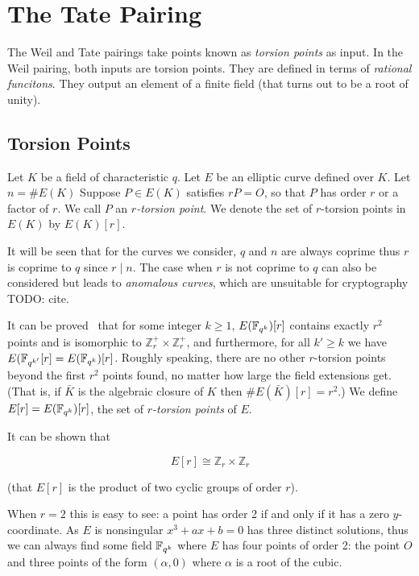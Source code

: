 \chapter {The Tate Pairing}

The Weil and Tate pairings take points known as \emph{torsion points}
as input. In the Weil pairing, both inputs are torsion points.
They are defined in terms of \emph{rational funcitons}.
They output an element of a finite field (that turns out to be a root of unity).

\section {Torsion Points}

Let $K$ be a field of characteristic $q$. Let $E$ be an elliptic curve defined
over $K$. Let $n=\#E(K)$
Suppose $P\in E(K)$ satisfies $r P = O$, so that $P$ has order $r$ or a
factor of $r$.
We call $P$ an \emph{$r$-torsion point}.
We denote the set of $r$-torsion points in $E(K)$ by
$E(K)[r]$.

It will be seen that for the curves we consider,
$q$ and $n$ are always coprime thus $r$ is coprime to $q$ since $r \mid n$.
The case when $r$ is not coprime
to $q$ can also be considered but leads to \emph{anomalous curves},
which are unsuitable for cryptography TODO: cite.

It can be proved~\cite{silverman} that for some integer $k \ge 1$,
$E(\mathbb{F}_{q^k})[r]$ contains exactly $r^2$ points and is isomorphic to
$\mathbb{Z}_r^+ \times \mathbb{Z}_r^+$,
and furthermore, for all $k' \ge k$ we have $E(\mathbb{F}_{q^{k'}} [r]
= E(\mathbb{F}_{q^k})[r]$.
Roughly speaking, there are no other $r$-torsion points beyond the
first $r^2$ points found, no matter how large the field extensions get.
(That is, if $\bar{K}$ is the algebraic closure of $K$ then $\#E(\bar{K})[r] = r^2$.)
We define $E[r] = E(\mathbb{F}_{q^k})[r]$, the set of
\emph{$r$-torsion points} of $E$.

It can be shown that

\[ E[r] \cong \mathbb{Z}_r \times \mathbb{Z}_r \]

(that $E[r]$ is the product of two cyclic groups of order $r$).

When $r=2$ this is easy to see: a point has order 2 if and only if it has
a zero $y$-coordinate. As $E$ is nonsingular
$x^3 + ax + b = 0$ has three distinct solutions, thus we can always find
some field $\mathbb{F}_{q^k}$ where $E$ has
four points of order 2: the point $O$ and three points of the form
$(\alpha, 0)$ where $\alpha$ is a root of the cubic.

